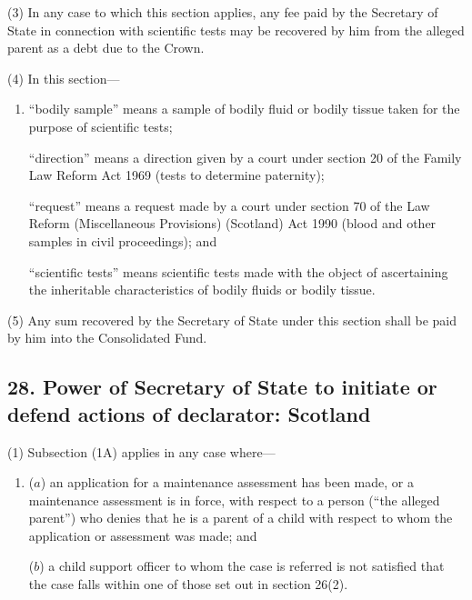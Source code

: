 \documentclass[12pt,a4paper]{article}
\begin{document}
(3) In any case to which this section applies, any fee paid by the Secretary of State in connection with scientific tests may be recovered by him from the alleged parent as a debt due to the Crown.

(4) In this section—
\begin{enumerate}\item[]
“bodily sample” means a sample of bodily fluid or bodily tissue taken for the purpose of scientific tests;

“direction” means a direction given by a court under section 20 of the Family Law Reform Act 1969 (tests to determine paternity);

“request” means a request made by a court under section 70 of the Law Reform (Miscellaneous Provisions) (Scotland) Act 1990 (blood and other samples in civil proceedings); and

“scientific tests” means scientific tests made with the object of ascertaining the inheritable characteristics of bodily fluids or bodily tissue.
\end{enumerate}

(5) Any sum recovered by the Secretary of State under this section shall be paid by him into the Consolidated Fund.


\subsection{28. Power of Secretary of State to initiate or defend actions of declarator: Scotland}

%
%

(1) Subsection (1A) applies in any case where—
\begin{enumerate}\item[]
($a$) an application for a maintenance assessment has been made, or a maintenance assessment is in force, with respect to a person (“the alleged parent”) who denies that he is a parent of a child with respect to whom the application or assessment was made; and

($b$) a child support officer to whom the case is referred is not satisfied that the case falls within one of those set out in section 26(2).
\end{enumerate}
\end{document}
